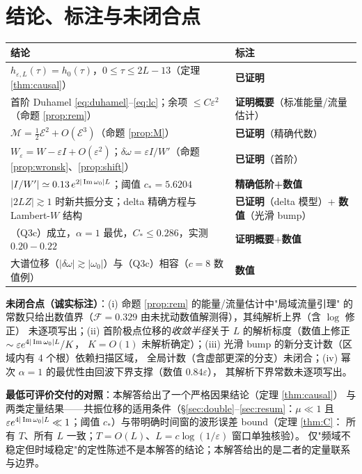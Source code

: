 \section{结论、标注与未闭合点}

\begin{center}\small
\begin{tabular}{p{9.6cm}l}
\toprule
{结论}& {标注}\\
\midrule
{$h_{\varepsilon,L}(\tau)=h_0(\tau)$，$0\le\tau\le2L-13$（定理 \ref{thm:causal}）}& {\textbf{已证明}}\\
{首阶 Duhamel \eqref{eq:duhamel}--\eqref{eq:lc}；余项 $\le C\varepsilon^2$（命题 \ref{prop:rem}）}& {\textbf{证明概要}（标准能量/流量估计）}\\
{$\mathcal M=\frac12\mathcal E^2+O(\mathcal E^3)$（命题 \ref{prop:M}）}& {\textbf{已证明}（精确代数）}\\
{$W_\varepsilon=W-\varepsilon I+O(\varepsilon^2)$；$\delta\omega=\varepsilon I/W'$（命题 \ref{prop:wronsk}、\ref{prop:shift}）}& {\textbf{已证明}（首阶）}\\
{$|I/W'|\simeq0.13\,e^{2|\operatorname{Im}\omega_0|L}$；阈值 $c_*=5.6204$}& {\textbf{精确低阶+数值}}\\
{$|2LZ|\gtrsim1$ 时新共振分支；delta 精确方程与 Lambert-$W$ 结构}& {\textbf{已证明}（delta 模型）+ \textbf{数值}（光滑 bump）}\\
{（Q3c）成立，$\alpha=1$ 最优，$C_*\le0.286$，实测 $0.20\!-\!0.22$}& {\textbf{证明概要}+\textbf{数值}}\\
{大谱位移（$|\delta\omega|\gtrsim|\omega_0|$）与（Q3c）相容（$c=8$ 数值例）}& {\textbf{数值}}\\
\bottomrule
\end{tabular}
\end{center}

\textbf{未闭合点（诚实标注）}：(i) 命题 \ref{prop:rem} 的能量/流量估计中"局域流量引理"
的常数只给出数值界（$\mathcal F=0.329$ 由未扰动数值解测得），其纯解析上界（含 $\log$ 修正）
未逐项写出；(ii) 首阶极点位移的\emph{收敛半径}关于 $L$ 的解析标度（数值上修正 $\sim\varepsilon e^{4|\operatorname{Im}\omega_0|L}/K$，
$K=O(1)$ 未解析确定）；(iii) 光滑 bump 的新分支计数（区域内有 4 个根）依赖扫描区域，
全局计数（含虚部更深的分支）未闭合；(iv) 幂次 $\alpha=1$ 的最优性由回波下界支撑（数值 $0.84\varepsilon$），
其解析下界常数未逐项写出。

\textbf{最低可评价交付的对照}：本解答给出了一个严格因果结论（定理 \ref{thm:causal}）
与两类定量结果——共振位移的适用条件（\S\ref{sec:double}--\ref{sec:resum}：$\mu\ll1$ 且
$\varepsilon e^{4|\operatorname{Im}\omega_0|L}\ll1$；阈值 $c_*$）与带明确时间窗的波形误差 bound（定理 \ref{thm:C}：
所有 $T$、所有 $L$ 一致；$T=O(L)$、$L=c\log(1/\varepsilon)$ 窗口单独核验）。
仅"频域不稳定但时域稳定"的定性陈述不是本解答的结论；本解答给出的是二者的定量联系与边界。


